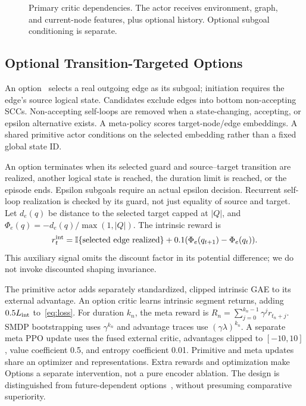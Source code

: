 \documentclass[conference]{IEEEtran}
\newcommand{\ind}{\mathbb{I}}
\begin{document}
\begin{figure}[t]
\centering
{}
\caption{Primary critic dependencies. The actor receives environment, graph, and current-node features, plus optional history. Optional subgoal conditioning is separate.}
\label{fig:architecture}
\end{figure}

\subsection{Optional Transition-Targeted Options}
\label{sec:options}
An option~\citep{SuttonPrecupSingh1999} selects a real outgoing edge as its subgoal; initiation requires the edge's source logical state. Candidates exclude edges into bottom non-accepting SCCs. Non-accepting self-loops are removed when a state-changing, accepting, or epsilon alternative exists. A meta-policy scores target-node/edge embeddings. A shared primitive actor conditions on the selected embedding rather than a fixed global state ID.

An option terminates when its selected guard and source--target transition are realized, another logical state is reached, the duration limit is reached, or the episode ends. Epsilon subgoals require an actual epsilon decision. Recurrent self-loop realization is checked by its guard, not just equality of source and target. Let $d_e(q)$ be distance to the selected target capped at $|Q|$, and $\Phi_e(q)=-d_e(q)/\max(1,|Q|)$. The intrinsic reward is
\begin{equation}
r_t^{\rm int}=\ind\{\text{selected edge realized}\}
+0.1(\Phi_e(q_{t+1})-\Phi_e(q_t)).
\label{eq:intrinsic}
\end{equation}
This auxiliary signal omits the discount factor in its potential difference; we do not invoke discounted shaping invariance.

The primitive actor adds separately standardized, clipped intrinsic GAE to its external advantage. An option critic learns intrinsic segment returns, adding $0.5L_{\rm int}$ to~\eqref{eq:loss}. For duration $k_n$, the meta reward is $R_n=\sum_{j=0}^{k_n-1}\gamma^jr_{t_n+j}$. SMDP bootstrapping uses $\gamma^{k_n}$ and advantage traces use $(\gamma\lambda)^{k_n}$. A separate meta PPO update uses the fused external critic, advantages clipped to $[-10,10]$, value coefficient 0.5, and entropy coefficient 0.01. Primitive and meta updates share an optimizer and representations. Extra rewards and optimization make Options a separate intervention, not a pure encoder ablation. The design is distinguished from future-dependent options~\citep{XuFekri2024}, without presuming comparative superiority.
\end{document}
